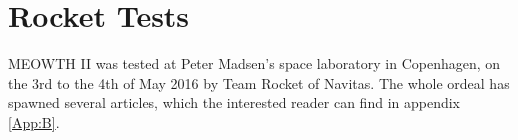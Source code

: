 \chapter{Rocket Tests}

	MEOWTH II was tested at Peter Madsen's space laboratory in Copenhagen, on the 3rd to the 4th of May 2016 by Team Rocket of Navitas. The whole ordeal has spawned several articles, which the interested reader can find in appendix \ref{App:B}.

	


%
%
%
%
%
%
%
